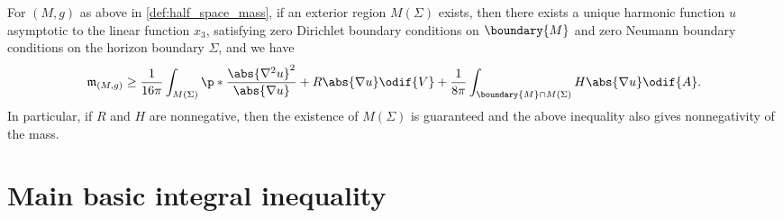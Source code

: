 \documentclass[titlepage,numbers=noenddot,headinclude,oneside,%
footinclude=true,cleardoublepage=empty,%
BCOR=5mm,paper=a4,fontsize=11pt,%
english,%
]{scrartcl}
\newcommand{\mass}[2]{\mathfrak{m}_{(#1,#2)}} %
\begin{document}
\begin{theorem}\label{thm:main_result}
    For \( (M,g) \) as above in \cref{def:half_space_mass}, if an exterior region \( M(\Sigma) \) exists, then
    there exists a unique harmonic function \( u \) asymptotic to the linear function \( x_3 \), satisfying zero Dirichlet boundary conditions on \( \boundary{M} \) and zero Neumann boundary conditions on the horizon boundary \( \Sigma \), and we have
    \begin{equation}
        \mass{M}{g}\geq \frac{1}{16\pi}\int_{M(\Sigma)}\p*{\frac{\abs{\nabla^2 u}^2}{\abs{\nabla u}}+R\abs{\nabla u}}\odif{V}+\frac{1}{8\pi}\int_{\boundary{M}\cap M(\Sigma)}H \abs{\nabla u}\odif{A}.\label{eq:main_result}
    \end{equation} 
    In particular, if \( R \) and \( H \) are nonnegative, then the existence of \( M(\Sigma) \) is guaranteed and the above inequality also gives nonnegativity of the mass.
\end{theorem} 



\section{Main basic integral inequality}
\end{document}
